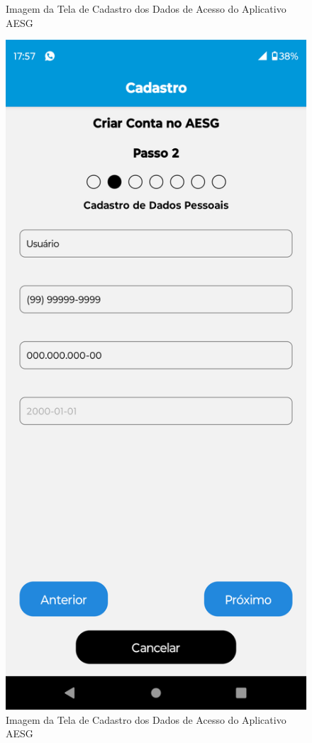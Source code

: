 \documentclass[
    12pt,                   %
    openright,              %
    oneside,                %
    a4paper,                %
    sumario=tradicional,    %
    english,                %
    brazil,                 %
    ]{abntex2}
\begin{document}
\begin{figure}[!h]
\begin{minipage}{0.5\textwidth}
                    \caption[Imagem da Tela de Cadastro dos Dados Pessoais do Aplicativo AESG]{ 
                    Imagem da Tela de Cadastro dos Dados de Acesso do Aplicativo AESG}
                    \label{fig:AppTelaCadastro11}
                \end{minipage}%
                \begin{minipage}{0.5\textwidth}
                    \centering
                    \includegraphics[width=0.8\linewidth]{Imagens/App Images User/AUCadastro2.png}
                    \caption[Imagem da Tela de Cadastro dos Dados de Pessoais Preenchido do Aplicativo AESG]{ 
                    Imagem da Tela de Cadastro dos Dados de Acesso do Aplicativo AESG}
                    \label{fig:AppTelaCadastro2}
                \end{minipage}
            \end{figure}
\end{document}
